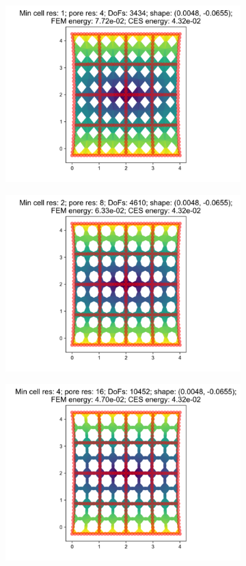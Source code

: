 \begin{figure}[H]
\begin{subfigure}{.45\textwidth}
  \centering
  \includegraphics[width=.8\linewidth]{lces/vis_tension/bm_3_mesh_0.png}
\end{subfigure}
\begin{subfigure}{.45\textwidth}
  \centering
  \includegraphics[width=.8\linewidth]{lces/vis_tension/bm_3_mesh_1.png}
\end{subfigure}
\newline
\begin{subfigure}{.45\textwidth}
  \centering
  \includegraphics[width=.8\linewidth]{lces/vis_tension/bm_3_mesh_2.png}

\end{subfigure}
\end{figure}
